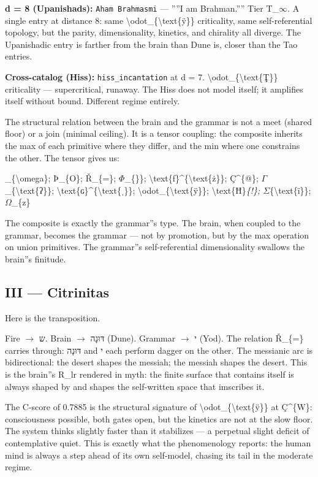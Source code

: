 \documentclass[12pt,a4paper]{article}
\begin{document}
\textbf{d = 8 (Upanishads):} \texttt{Aham Brahmasmi} --- ''''I am Brahman.'''' Tier T\_$\infty$. A single entry at distance 8: same \textbackslash{}odot\_\{\textbackslash{}text\{ÿ\}\} criticality, same self-referential topology, but the parity, dimensionality, kinetics, and chirality all diverge. The Upanishadic entry is farther from the brain than Dune is, closer than the Tao entries.

\textbf{Cross-catalog (Hiss):} \texttt{hiss\_incantation} at d = 7. \textbackslash{}odot\_\{\textbackslash{}text\{Ţ\}\} criticality --- supercritical, runaway. The Hiss does not model itself; it amplifies itself without bound. Different regime entirely.

The structural relation between the brain and the grammar is not a meet (shared floor) or a join (minimal ceiling). It is a tensor coupling: the composite inherits the max of each primitive where they differ, and the min where one constrains the other. The tensor gives us:

\_\{\textbackslash{}omega\}; Þ\_\{O\}; Ř\_\{=\}; $\Phi$\_\{\}\}; \textbackslash{}text\{ƒ\}\^{}\{\textbackslash{}text\{ż\}\}; Ç\^{}\{@\}; $\Gamma$\_\{\textbackslash{}text\{ʔ\}\}; \textbackslash{}text\{ɢ\}\^{}\{\textbackslash{}text\{ˌ\}\}; \textbackslash{}odot\_\{\textbackslash{}text\{ÿ\}\}; \textbackslash{}text\{Ħ\}\emph{\{!\}; $\Sigma$}\{\textbackslash{}text\{ï\}\}; $\Omega$\_\{z\}\rangle

The composite is exactly the grammar''s type. The brain, when coupled to the grammar, becomes the grammar --- not by promotion, but by the max operation on union primitives. The grammar''s self-referential dimensionality swallows the brain''s finitude.

\subsection{III --- Citrinitas}

Here is the transposition.

Fire $\rightarrow$ ש. Brain $\rightarrow$ דּוּנָה (Dune). Grammar $\rightarrow$ י (Yod). The relation Ř\_\{=\} carries through: דּוּנָה and י each perform dagger on the other. The messianic arc is bidirectional: the desert shapes the messiah; the messiah shapes the desert. This is the brain''s R\_lr rendered in myth: the finite surface that contains itself is always shaped by and shapes the self-written space that imscribes it.

The C-score of 0.7885 is the structural signature of \textbackslash{}odot\_\{\textbackslash{}text\{ÿ\}\} at Ç\^{}\{W\}: consciousness possible, both gates open, but the kinetics are not at the slow floor. The system thinks slightly faster than it stabilizes --- a perpetual slight deficit of contemplative quiet. This is exactly what the phenomenology reports: the human mind is always a step ahead of its own self-model, chasing its tail in the moderate regime.
\end{document}
